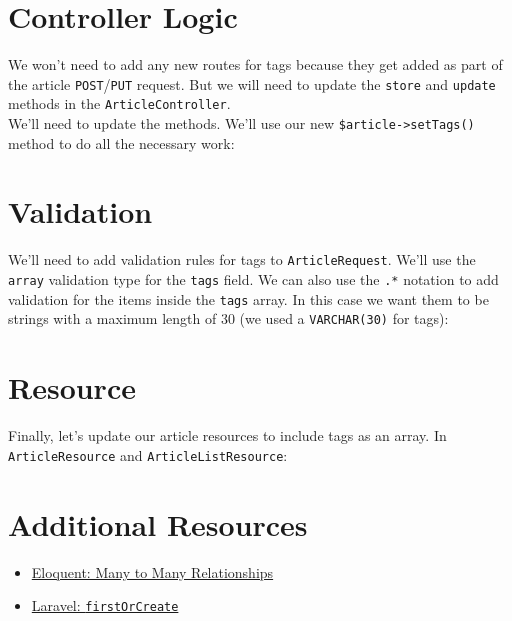 \section{Controller Logic}

We won't need to add any new routes for tags because they get added as part of the article \texttt{POST}/\texttt{PUT} request. But we will need to update the \texttt{store} and \texttt{update} methods in the \texttt{ArticleController}.
\\

We'll need to update the methods. We'll use our new \texttt{\$article->setTags()} method to do all the necessary work:



\section{Validation}

We'll need to add validation rules for tags to \texttt{ArticleRequest}. We'll use the \texttt{array} validation type for the \texttt{tags} field. We can also use the \texttt{.*} notation to add validation for the items inside the \texttt{tags} array. In this case we want them to be strings with a maximum length of 30 (we used a \texttt{VARCHAR(30)} for tags):



\section{Resource}

Finally, let's update our article resources to include tags as an array. In \texttt{ArticleResource} and \texttt{ArticleListResource}:




\section{Additional Resources}

\begin{itemize}[leftmargin=*]
    \item \href{http://laravel.com/docs/master/eloquent-relationships#many-to-many}{Eloquent: Many to Many Relationships}
    \item \href{http://laravel.com/docs/master/eloquent#other-creation-methods}{Laravel: \texttt{firstOrCreate}}
\end{itemize}
